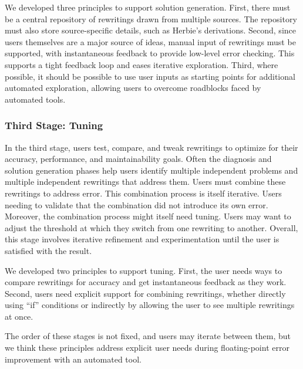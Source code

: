 We developed three principles to support solution generation.
First, there must be a central repository
  of rewritings drawn from multiple sources.
The repository must also store source-specific details,
  such as Herbie's derivations.
Second, since users themselves are a major source of ideas,
  manual input of rewritings must be supported,
  with instantaneous feedback to provide low-level error checking.
This supports a tight feedback loop and eases iterative exploration.
Third, where possible, it should be possible to use user inputs
  as starting points for additional automated exploration,
  allowing users to overcome roadblocks faced by automated tools.

\subsubsection*{Third Stage: Tuning}

In the third stage, users test, compare, and tweak rewritings
  to optimize for their accuracy, performance, and maintainability goals.
Often the diagnosis and solution generation phases help users identify multiple independent problems
  and multiple independent rewritings that address them.
Users must combine these rewritings to address error.
This combination process is itself iterative.
  Users needing to validate
  that the combination did not introduce its own error.
Moreover, the combination process might itself need tuning.
  Users may want to adjust the threshold at which
  they switch from one rewriting to another.
Overall, this stage involves iterative refinement and experimentation 
  until the user is satisfied with the result.

We developed two principles to support tuning.
First, the user needs ways to compare rewritings for accuracy
  and get instantaneous feedback as they work.
Second, users need explicit support for combining rewritings,
  whether directly using ``if'' conditions
  or indirectly by allowing the user to see multiple rewritings at once.

The order of these stages is not fixed, and users may iterate between them,
  but we think these principles address explicit user
  needs during floating-point error improvement
  with an automated tool.


